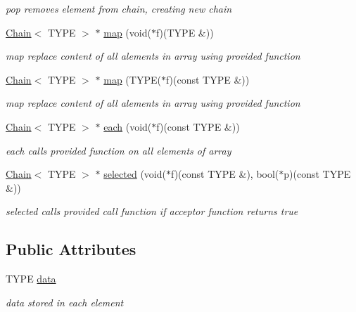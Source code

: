 \begin{DoxyCompactItemize}
\begin{DoxyCompactList}\small\item\em pop removes element from chain, creating new chain \end{DoxyCompactList}\item 
\hyperlink{classChain}{Chain}$<$ T\+Y\+P\+E $>$ $\ast$ \hyperlink{classChain_ace1c46fda105bc0cefe6337b793069de}{map} (void($\ast$f)(T\+Y\+P\+E \&))
\begin{DoxyCompactList}\small\item\em map replace content of all alements in array using provided function \end{DoxyCompactList}\item 
\hyperlink{classChain}{Chain}$<$ T\+Y\+P\+E $>$ $\ast$ \hyperlink{classChain_a5014320320b6044de28f27d7937165f3}{map} (T\+Y\+P\+E($\ast$f)(const T\+Y\+P\+E \&))
\begin{DoxyCompactList}\small\item\em map replace content of all alements in array using provided function \end{DoxyCompactList}\item 
\hyperlink{classChain}{Chain}$<$ T\+Y\+P\+E $>$ $\ast$ \hyperlink{classChain_ac21ec871573a170a704e6e06a9cac6ab}{each} (void($\ast$f)(const T\+Y\+P\+E \&))
\begin{DoxyCompactList}\small\item\em each calls provided function on all elements of array \end{DoxyCompactList}\item 
\hyperlink{classChain}{Chain}$<$ T\+Y\+P\+E $>$ $\ast$ \hyperlink{classChain_a95ad9170db946acf028ba2e98c349595}{selected} (void($\ast$f)(const T\+Y\+P\+E \&), bool($\ast$p)(const T\+Y\+P\+E \&))
\begin{DoxyCompactList}\small\item\em selected calls provided call function if acceptor function returns true \end{DoxyCompactList}\end{DoxyCompactItemize}
\subsection*{Public Attributes}
\begin{DoxyCompactItemize}
\item 
\hypertarget{classChain_aeb9b72f09201d5553bb04e25593dc7fa}{}T\+Y\+P\+E \hyperlink{classChain_aeb9b72f09201d5553bb04e25593dc7fa}{data}\label{classChain_aeb9b72f09201d5553bb04e25593dc7fa}

\begin{DoxyCompactList}\small\item\em data stored in each element \end{DoxyCompactList}\end{DoxyCompactItemize}


